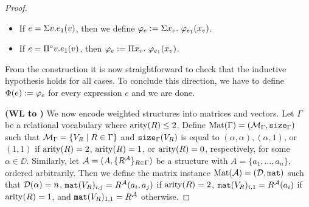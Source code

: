\begin{proof}
\begin{itemize}
	\item If $e=\Sigma v. e_1(v)$, then we define $\varphi_e := \Sigma x_{v}. \  \varphi_{e_1}(x_v)$.

  \item If $e=\Pi^{\circ} v. e_1(v)$, then $\varphi_e := \Pi x_{v}.\  \varphi_{e_1}(x_v)$.
\end{itemize}
From the construction it is now straightforward to check that the inductive hypothesis holds for all cases. To conclude this direction, we have to define $\Phi(e) := \varphi_e$ for every expression $e$ and we are done.

\medskip
\noindent \textbf{(WL to \langprod)} We now encode weighted structures into matrices and vectors. Let $\Gamma$ be a relational vocabulary 
where $\operatorname{arity}(R) \leq 2$. 
Define $\text{Mat}(\Gamma) = (\mathcal{M}_\Gamma,\texttt{size}_\Gamma)$ such 
that $\mathcal{M}_\Gamma = \{ V_{R} \mid R \in \Gamma\}$ and $\texttt{size}_\Gamma(V_{R})$ is equal to 
$(\alpha, \alpha), (\alpha, 1)$, or $(1,1)$ if $\operatorname{arity}(R)=2$, $\operatorname{arity}(R)=1$, or $\operatorname{arity}(R)=0$, 
respectively, for some $\alpha \in \DD$. Similarly, let $\mathcal{A} = (A, \{R^{\mathcal{A}}\}_{R \in \Gamma})$ 
be a structure with $A = \{a_1, \ldots, a_n\}$, ordered arbitrarily.
Then we define the matrix instance $\text{Mat}(\mathcal{A}) = (\mathcal{D},\texttt{mat})$ such that $\mathcal{D}(\alpha) = n$, 
$\texttt{mat}(V_{R})_{i,j} = R^{\mathcal{A}}(a_i, a_j)$ if $\operatorname{arity}(R)=2$, $\texttt{mat}(V_{R})_{i,1} = R^{\mathcal{A}}(a_i)$ if $\operatorname{arity}(R)=1$, 
and $\texttt{mat}(V_{R})_{1,1} = R^{\mathcal{A}}$ otherwise.

\newcommand{\evarphi}{e_\varphi}


\end{proof}
